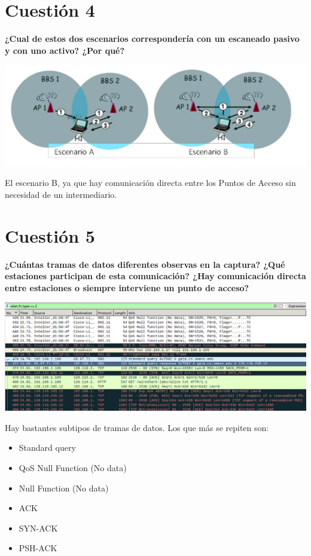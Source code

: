 \documentclass{article}
\begin{document}
\section{Cuestión 4}

\textbf{¿Cual de estos dos escenarios correspondería con un escaneado pasivo y con uno
activo? ¿Por qué?}

\begin{center}
\includegraphics[scale=0.4]{WLAN/c4.png}
\end{center}

El escenario B, ya que hay comunicación directa entre los Puntos de Acceso sin necesidad de un intermediario.

\section{Cuestión 5}

\textbf{¿Cuántas tramas de datos diferentes observas en la captura? ¿Qué estaciones
participan de esta comunicación? ¿Hay comunicación directa entre estaciones o siempre
interviene un punto de acceso?}

\begin{center}
\includegraphics[scale=0.3]{WLAN/lista.png}
\end{center}

Hay bastantes subtipos de tramas de datos. Los que más se repiten son:

\begin{itemize}
\item Standard query
\item QoS Null Function (No data)
\item Null Function (No data)
\item ACK
\item SYN-ACK
\item PSH-ACK
\end{itemize}
\end{document}
